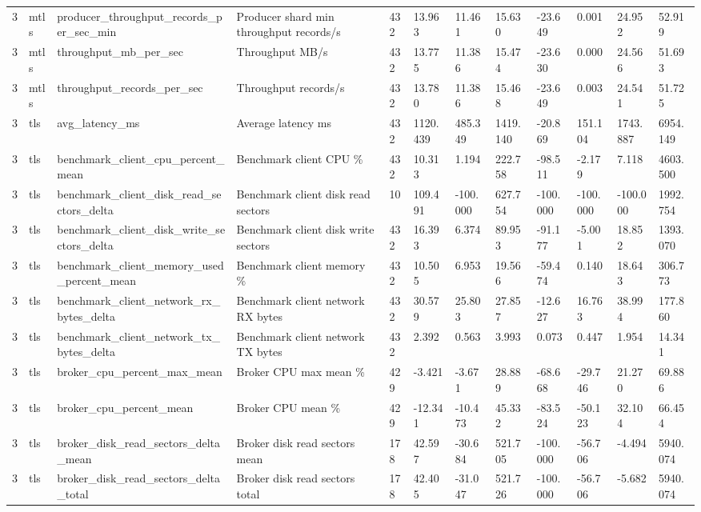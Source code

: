 \begin{longtable}{llllllllllll}
3 & mtls & producer\_throughput\_records\_per\_sec\_min & Producer shard min throughput records/s & 432 & 13.963 & 11.461 & 15.630 & -23.649 & 0.001 & 24.952 & 52.919 \\
3 & mtls & throughput\_mb\_per\_sec & Throughput MB/s & 432 & 13.775 & 11.386 & 15.474 & -23.630 & 0.000 & 24.566 & 51.693 \\
3 & mtls & throughput\_records\_per\_sec & Throughput records/s & 432 & 13.780 & 11.386 & 15.468 & -23.649 & 0.003 & 24.541 & 51.725 \\
3 & tls & avg\_latency\_ms & Average latency ms & 432 & 1120.439 & 485.349 & 1419.140 & -20.869 & 151.104 & 1743.887 & 6954.149 \\
3 & tls & benchmark\_client\_cpu\_percent\_mean & Benchmark client CPU \% & 432 & 10.313 & 1.194 & 222.758 & -98.511 & -2.179 & 7.118 & 4603.500 \\
3 & tls & benchmark\_client\_disk\_read\_sectors\_delta & Benchmark client disk read sectors & 10 & 109.491 & -100.000 & 627.754 & -100.000 & -100.000 & -100.000 & 1992.754 \\
3 & tls & benchmark\_client\_disk\_write\_sectors\_delta & Benchmark client disk write sectors & 432 & 16.393 & 6.374 & 89.953 & -91.177 & -5.001 & 18.852 & 1393.070 \\
3 & tls & benchmark\_client\_memory\_used\_percent\_mean & Benchmark client memory \% & 432 & 10.505 & 6.953 & 19.566 & -59.474 & 0.140 & 18.643 & 306.773 \\
3 & tls & benchmark\_client\_network\_rx\_bytes\_delta & Benchmark client network RX bytes & 432 & 30.579 & 25.803 & 27.857 & -12.627 & 16.763 & 38.994 & 177.860 \\
3 & tls & benchmark\_client\_network\_tx\_bytes\_delta & Benchmark client network TX bytes & 432 & 2.392 & 0.563 & 3.993 & 0.073 & 0.447 & 1.954 & 14.341 \\
3 & tls & broker\_cpu\_percent\_max\_mean & Broker CPU max mean \% & 429 & -3.421 & -3.671 & 28.889 & -68.668 & -29.746 & 21.270 & 69.886 \\
3 & tls & broker\_cpu\_percent\_mean & Broker CPU mean \% & 429 & -12.341 & -10.473 & 45.332 & -83.524 & -50.123 & 32.104 & 66.454 \\
3 & tls & broker\_disk\_read\_sectors\_delta\_mean & Broker disk read sectors mean & 178 & 42.597 & -30.684 & 521.705 & -100.000 & -56.706 & -4.494 & 5940.074 \\
3 & tls & broker\_disk\_read\_sectors\_delta\_total & Broker disk read sectors total & 178 & 42.405 & -31.047 & 521.726 & -100.000 & -56.706 & -5.682 & 5940.074 \\

\end{longtable}

